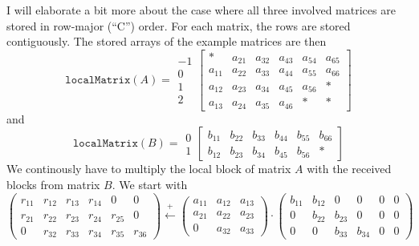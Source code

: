 I will elaborate a bit more about the case where all three involved
matrices are stored in row-major (``C'') order. 
For each matrix, the rows are stored contiguously. The stored arrays
of the example matrices are then
\begin{displaymath}
  \mathtt{localMatrix}(A)=  \begin{array}{c}
    -1\\
    0\\
    1\\
    2
  \end{array}
\left[
  \begin{array}{ccc|ccc}
    *     & a_{21} & a_{32} & a_{43} & a_{54} & a_{65} \\
    a_{11} & a_{22} & a_{33} & a_{44} & a_{55} & a_{66} \\
    a_{12} & a_{23} & a_{34} & a_{45} & a_{56} & * \\
    a_{13} & a_{24} & a_{35} & a_{46} & * & * 
  \end{array}
\right]
\end{displaymath}
and
\begin{displaymath}
  \mathtt{localMatrix}(B)=  \begin{array}{c}
    0\\
    1
  \end{array}
\left[
  \begin{array}{ccc|ccc}
    b_{11} & b_{22} & b_{33} & b_{44} & b_{55} & b_{66} \\
    b_{12} & b_{23} & b_{34} & b_{45} & b_{56} & * 
  \end{array}
\right]
\end{displaymath}
We continously have to multiply the local block of matrix $A$ with the
received blocks from matrix $B$. We start with 
\begin{displaymath}
  \left(\begin{array}{cccccc}
    r_{11} &r_{12} &r_{13}& r_{14} & 0 & 0\\
    r_{21} &r_{22} &r_{23}& r_{24} & r_{25} & 0\\
    0 &r_{32} &r_{33}& r_{34} & r_{35} & r_{36}
  \end{array}\right) \stackrel{+}{\longleftarrow}
  \left(\begin{array}{ccc}
      a_{11} &a_{12} &a_{13} \\
      a_{21} &a_{22} &a_{23}\\
      0 &a_{32} &a_{33}
  \end{array}\right)
\cdot
  \left(\begin{array}{cccccc}
    b_{11} &b_{12} & 0 & 0 & 0 & 0\\
    0 &b_{22} &b_{23}& 0 & 0 & 0\\
    0 & 0 &b_{33}& b_{34} & 0 & 0
  \end{array}\right)
\end{displaymath}
